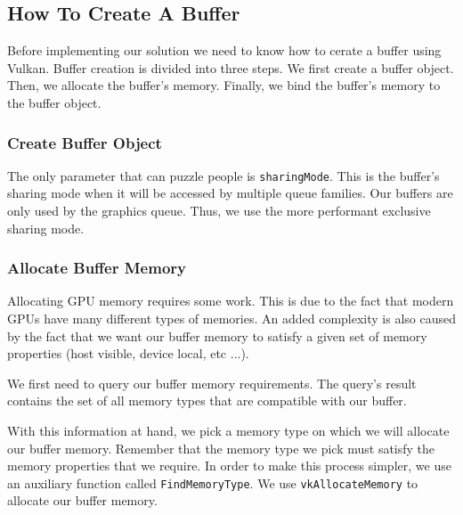\subsection{How To Create A Buffer}

Before implementing our solution we need to know how to cerate a buffer using Vulkan.
Buffer creation is divided into three steps.
We first create a buffer object.
Then, we allocate the buffer's memory.
Finally, we bind the buffer's memory to the buffer object.

\subsubsection{Create Buffer Object}

The only parameter that can puzzle people is \texttt{sharingMode}.
This is the buffer's sharing mode when it will be accessed by
multiple queue families.
Our buffers are only used by the graphics queue.
Thus, we use the more performant exclusive sharing mode.

\begin{minipage}{\linewidth}{\noindent}
    
\end{minipage}

\subsubsection{Allocate Buffer Memory}

Allocating GPU memory requires some work.
This is due to the fact that modern GPUs have many different types
of memories.
An added complexity is also caused by the fact that we
want our buffer memory to satisfy a given set of memory properties
(host visible, device local, etc ...).

\begin{minipage}{\linewidth}{\noindent}
    
\end{minipage}

We first need to query our buffer memory requirements.
The query's result contains the set of all memory types that are compatible
with our buffer.

With this information at hand, we pick a memory type on which we will
allocate our buffer memory.
Remember that the memory type we pick must satisfy the memory properties
that we require.
In order to make this process simpler, we use an auxiliary function
called \texttt{FindMemoryType}.
We use \texttt{vkAllocateMemory} to allocate our buffer memory.


